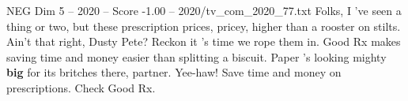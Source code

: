 \begin{textsample}{NEG Dim 5 – 2020 – Score -1.00 – 2020/tv\_com\_2020\_77.txt}  \label{ex:f5_neg_069}
Folks, I 've seen a thing or two, but these prescription prices, pricey, higher than a rooster on stilts.
Ain't that right, Dusty Pete?
Reckon it 's time we rope them in.
Good Rx makes saving time and money easier than splitting a biscuit.
Paper 's looking mighty \textbf{big} for its britches there, partner.
Yee-haw!
Save time and money on prescriptions.
Check Good Rx.

\end{textsample}
